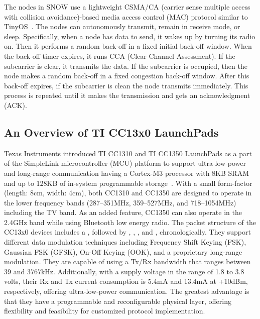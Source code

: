 The nodes in SNOW use a lightweight CSMA/CA (carrier sense multiple access with collision avoidance)-based media access control (MAC) protocol similar to TinyOS~\cite{tinyos}. The nodes can autonomously transmit, remain in receive mode, or sleep. Specifically, when a node has data to send, it wakes up by turning its radio on. Then it performs a random back-off in a fixed initial back-off window. When the back-off timer expires, it runs CCA (Clear Channel Assessment). If the subcarrier is clear, it transmits the data. If the subcarrier is occupied, then the node makes a random back-off in a fixed congestion back-off window. After this back-off expires, if the subcarrier is clean the node transmits immediately. This process is repeated until it makes the transmission and gets an acknowledgment (ACK).


\subsection{An Overview of TI CC13x0 LaunchPads}
Texas Instruments introduced TI CC1310 and TI CC1350 LaunchPads as a part of the SimpleLink microcontroller (MCU) platform to support ultra-low-power and long-range communication having a Cortex-M3 processor with 8KB SRAM and up to 128KB of in-system programmable storage~\cite{cc1350, snow_cots}.
With a small form-factor (length: 8cm, width: 4cm), both CC1310 and CC1350 are designed to operate in the lower frequency bands (287--351MHz, 359--527MHz, and 718--1054MHz) including the TV band. As an added feature, CC1350 can also operate in the 2.4GHz band while using Bluetooth low energy radio.
The packet structure of the CC13x0 devices includes a , followed by , , , and , chronologically. They support different data modulation techniques including Frequency Shift Keying (FSK), Gaussian FSK (GFSK), On-Off Keying (OOK), and a proprietary long-range modulation. They are capable of using a Tx/Rx bandwidth that ranges between 39 and 3767kHz. 
Additionally, with a supply voltage in the range of 1.8 to 3.8 volts, their Rx and Tx current consumption is 5.4mA and 13.4mA at +10dBm, respectively, offering ultra-low-power communication. 
The greatest advantage is that  
they have a programmable and reconfigurable physical layer, offering flexibility and feasibility for customized protocol implementation.











